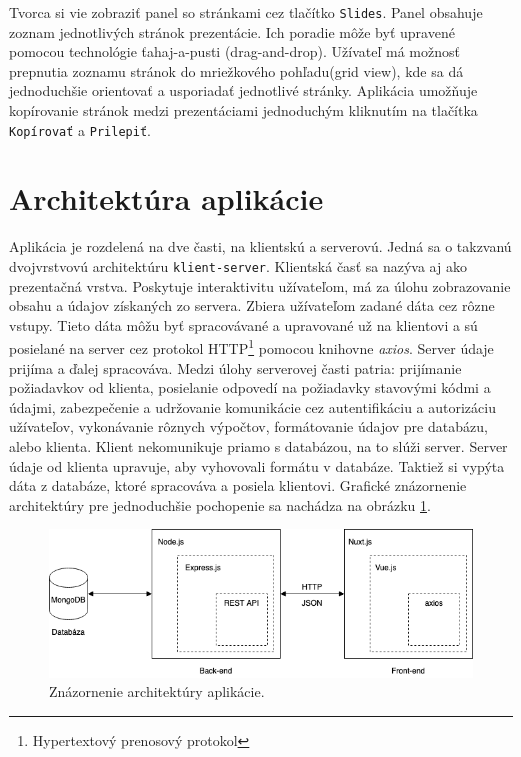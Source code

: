 Tvorca si vie zobraziť panel so stránkami cez tlačítko \texttt{Slides}. Panel obsahuje zoznam jednotlivých stránok prezentácie. Ich poradie môže byť upravené pomocou technológie ťahaj-a-pusti (drag-and-drop). Užívateľ má možnosť prepnutia zoznamu stránok do mriežkového pohľadu(grid view), kde sa dá jednoduchšie orientovať a usporiadať jednotlivé stránky. Aplikácia umožňuje kopírovanie stránok medzi prezentáciami jednoduchým kliknutím na tlačítka \texttt{Kopírovať} a \texttt{Prilepiť}.

\section{Architektúra aplikácie}
\label{architecture}
Aplikácia je rozdelená na dve časti, na klientskú a serverovú. Jedná sa o takzvanú dvojvrstvovú architektúru \texttt{klient-server}. Klientská časť sa nazýva aj ako prezentačná vrstva. Poskytuje interaktivitu užívateľom, má za úlohu zobrazovanie obsahu a údajov získaných zo servera. Zbiera užívateľom zadané dáta cez rôzne vstupy. Tieto dáta môžu byť spracovávané a upravované už na klientovi a sú posielané na server cez protokol HTTP\footnote{Hypertextový prenosový protokol} pomocou knihovne \textit{axios}. Server údaje prijíma a ďalej spracováva. Medzi úlohy serverovej časti patria: prijímanie požiadavkov od klienta, posielanie odpovedí na požiadavky stavovými kódmi a údajmi, zabezpečenie a udržovanie komunikácie cez autentifikáciu a autorizáciu užívateľov, vykonávanie rôznych výpočtov, formátovanie údajov pre databázu, alebo klienta. Klient nekomunikuje priamo s databázou, na to slúži server. Server údaje od klienta upravuje, aby vyhovovali formátu v databáze. Taktiež si vypýta dáta z databáze, ktoré spracováva a posiela klientovi. Grafické znázornenie architektúry pre jednoduchšie pochopenie sa nachádza na obrázku \ref{pic:architektura}.

    \begin{figure}[!hbt]
        \centering
        \includegraphics[scale=0.6]{obrazky/architektura.png}
        \caption{Znázornenie architektúry aplikácie.}
        \label{pic:architektura}
    \end{figure}
    
